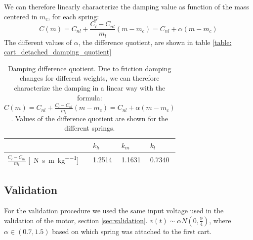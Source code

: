 We can therefore linearly characterize the damping value as function of the mass centered in $m_c$, for each spring:
$$C(m)=C_{nl}+ \frac{C_{l}-C_{nl}}{m_{l}}(m -m_{c}) = C_{nl} +\alpha (m-m_{c})$$
The different values of $\alpha$, the difference quotient, are shown in table \ref{table: cart_detached_damping_quotient}

\begin{table}[!h]
\centering
\label{table: cart_attached_damping_quotient}
\begin{tabular}{|l|l|l|l|}
\hline
 & \textbf{$k_h$} & \textbf{$k_m$}   & \textbf{$k_l$}   \\ \hline
$\frac{C_{l}-C_{nl}}{m_{l}}$ [\SI{}{\newton \second \per \metre \per \kilo\gram}]       &1.2514   & 1.1631 & 0.7340 \\ \hline
\end{tabular}
\caption{Damping difference quotient. Due to friction damping changes for different weights, we can therefore characterize the damping in a linear way with the formula: $C(m)=C_{nl}+ \frac{C_{l}-C_{nl}}{m_{l}}(m -m_{c})= C_{nl} +\alpha (m-m_{c})$. Values of the difference quotient are shown for the different springs.}
\end{table}

\subsection{Validation}
For the validation procedure we used the same input voltage used in the validation of the motor, section \ref{sec:validation}. $v(t) \sim \alpha N(0,\frac{9}{4})$, where $\alpha \in (0.7, 1.5)$ based on which spring was attached to the first cart. 
